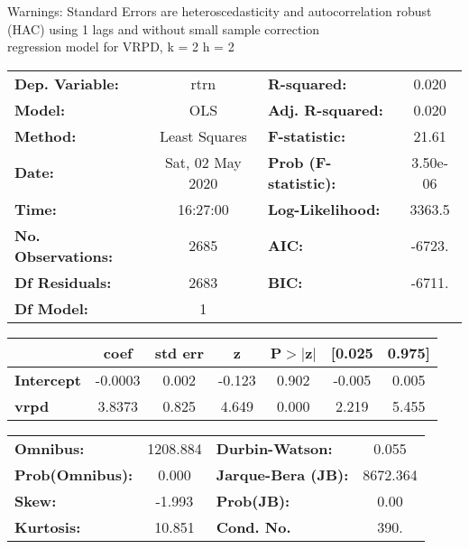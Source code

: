 Warnings: \newline
 [1] Standard Errors are heteroscedasticity and autocorrelation robust (HAC) using 1 lags and without small sample correction\\ 

regression model for VRPD, k = 2 h = 2\begin{center}
\begin{tabular}{lclc}
\toprule
\textbf{Dep. Variable:}    &       rtrn       & \textbf{  R-squared:         } &     0.020   \\
\textbf{Model:}            &       OLS        & \textbf{  Adj. R-squared:    } &     0.020   \\
\textbf{Method:}           &  Least Squares   & \textbf{  F-statistic:       } &     21.61   \\
\textbf{Date:}             & Sat, 02 May 2020 & \textbf{  Prob (F-statistic):} &  3.50e-06   \\
\textbf{Time:}             &     16:27:00     & \textbf{  Log-Likelihood:    } &    3363.5   \\
\textbf{No. Observations:} &        2685      & \textbf{  AIC:               } &    -6723.   \\
\textbf{Df Residuals:}     &        2683      & \textbf{  BIC:               } &    -6711.   \\
\textbf{Df Model:}         &           1      & \textbf{                     } &             \\
\bottomrule
\end{tabular}
\begin{tabular}{lcccccc}
                   & \textbf{coef} & \textbf{std err} & \textbf{z} & \textbf{P$> |$z$|$} & \textbf{[0.025} & \textbf{0.975]}  \\
\midrule
\textbf{Intercept} &      -0.0003  &        0.002     &    -0.123  &         0.902        &       -0.005    &        0.005     \\
\textbf{vrpd}      &       3.8373  &        0.825     &     4.649  &         0.000        &        2.219    &        5.455     \\
\bottomrule
\end{tabular}
\begin{tabular}{lclc}
\textbf{Omnibus:}       & 1208.884 & \textbf{  Durbin-Watson:     } &    0.055  \\
\textbf{Prob(Omnibus):} &   0.000  & \textbf{  Jarque-Bera (JB):  } & 8672.364  \\
\textbf{Skew:}          &  -1.993  & \textbf{  Prob(JB):          } &     0.00  \\
\textbf{Kurtosis:}      &  10.851  & \textbf{  Cond. No.          } &     390.  \\
\bottomrule
\end{tabular}
\end{center}

